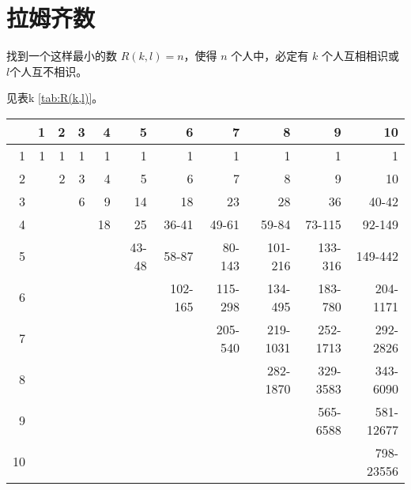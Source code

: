 \section{拉姆齐数}
\label{sec:拉姆齐数}



找到一个这样最小的数 $R(k, l) = n$，使得 $n$ 个人中，必定有 $k$ 个人互相相识或
$l$个人互不相识。

见表k \ref{tab:R(k,l)}。

\begin{table*}[t]
\centering
\begin{tabular}{rrrrrrrrrrr}
    \toprule
       & 1 & 2 & 3 &  4 &     5 &       6 &       7 &        8 &        9 &        10 \\
    \midrule
     1 & 1 & 1 & 1 &  1 &     1 &       1 &       1 &        1 &        1 &         1 \\
     2 &   & 2 & 3 &  4 &     5 &       6 &       7 &        8 &        9 &        10 \\
     3 &   &   & 6 &  9 &    14 &      18 &      23 &       28 &       36 &     40-42 \\
     4 &   &   &   & 18 &    25 &   36-41 &   49-61 &    59-84 &   73-115 &    92-149 \\
     5 &   &   &   &    & 43-48 &   58-87 &  80-143 &  101-216 &  133-316 &   149-442 \\
     6 &   &   &   &    &       & 102-165 & 115-298 &  134-495 &  183-780 &  204-1171 \\
     7 &   &   &   &    &       &         & 205-540 & 219-1031 & 252-1713 &  292-2826 \\
     8 &   &   &   &    &       &         &         & 282-1870 & 329-3583 &  343-6090 \\
     9 &   &   &   &    &       &         &         &          & 565-6588 & 581-12677 \\
    10 &   &   &   &    &       &         &         &          &          & 798-23556 \\
    \bottomrule
\end{tabular}
\caption{$R(k, l)$}
\label{tab:R(k,l)}
\end{table*}
